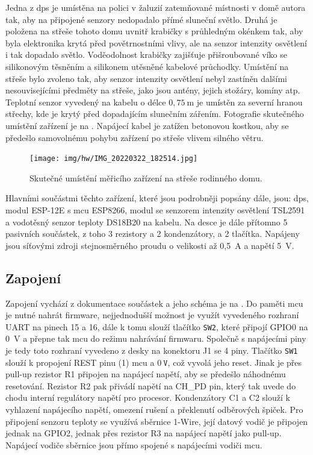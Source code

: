     Jedna z \acrshort{dps} je umístěna na polici v žaluzií zatemňované místnosti v domě autora tak, aby na připojené senzory nedopadalo přímé sluneční světlo. Druhá je položena na střeše tohoto domu uvnitř krabičky s průhledným okénkem tak, aby byla elektronika krytá před povětrnostními vlivy, ale na senzor intenzity osvětlení i tak dopadalo světlo. Voděodolnost krabičky zajišťuje přišroubované víko se silikonovým těsněním a silikonem utěsněné kabelové průchodky. Umístění na střeše bylo zvoleno tak, aby senzor intenzity osvětlení nebyl zastíněn dalšími nesouvisejícími předměty na střeše, jako jsou antény, jejich stožáry, komíny atp. Teplotní senzor vyvedený na kabelu o délce $0{,}75~\textrm{m}$ je umístěn za severní hranou střechy, kde je krytý před dopadajícím slunečním zářením. Fotografie skutečného umístění zařízení je na . Napájecí kabel je zatížen betonovou kostkou, aby se předešlo samovolnému pohybu zařízení po střeše vlivem silného větru.
    \begin{figure}
        \centering
        \texttt{[image: img/hw/IMG\_20220322\_182514.jpg]}
        \caption[Skutečné umístění měřicího zařízení]{Skutečné umístění měřicího zařízení na střeše rodinného domu.}
        \label{fig:senzor}
    \end{figure}
    
    Hlavními součástmi těchto zařízení, které jsou podrobněji popsány dále, jsou: \acrshort{dps}, modul ESP-12E s \acrshort{mcu} ESP8266, modul se senzorem intenzity osvětlení TSL2591 a vodotěsný senzor teploty DS18B20 na kabelu. Na desce je dále přítomno 5 pasivních součástek, z toho 3 rezistory a 2 kondenzátory, a 2 tlačítka. Napájeny jsou síťovými zdroji stejnosměrného proudu o velikosti až 0{,}5~A a napětí 5~V.
    \subsection{Zapojení}
        Zapojení vychází z dokumentace součástek a jeho schéma je na . Do paměti \acrshort{mcu} je nutné nahrát firmware, nejjednodušší možnost je využít vyvedeného rozhraní UART na pinech 15 a 16, dále k tomu slouží tlačítko \texttt{SW2}, které připojí GPIO0 na 0~V a přepne tak \acrshort{mcu} do režimu nahrávání firmwaru. Společně s napájecími piny je tedy toto rozhraní vyvedeno z desky na konektoru J1 se 4 piny. Tlačítko \texttt{SW1} slouží k propojení REST pinu (1) \acrshort{mcu} a $0~\texttt{V}$, což vyvolá jeho reset. Jinak je přes pull-up rezistor R1 připojen na napájecí napětí, aby se předešlo náhodnému resetování. Rezistor R2 pak přivádí napětí na CH\_PD pin, který tak uvede do chodu interní regulátory napětí pro procesor. Kondenzátory C1 a C2 slouží k vyhlazení napájecího napětí, omezení rušení a překlenutí odběrových špiček. Pro připojení senzoru teploty se využívá sběrnice 1-Wire, její datový vodič je připojen jednak na GPIO2, jednak přes rezistor R3 na napájecí napětí jako pull-up. Napájecí vodiče sběrnice jsou přímo spojené s napájecími vodiči \acrshort{mcu}.

